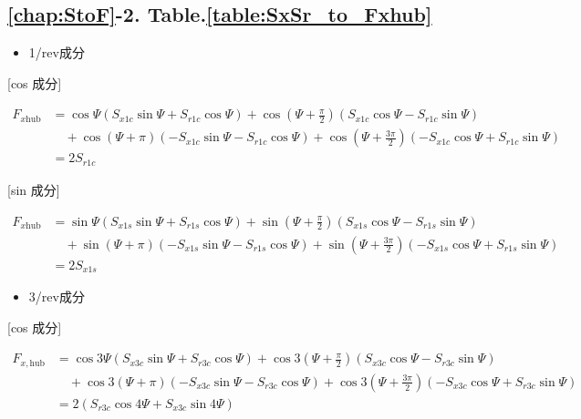     \subsection*{\ref{chap:StoF}-2. Table.\ref{table:SxSr_to_Fxhub}}

    \begin{itemize}
    \item 1/rev成分
    \end{itemize}

    [cos 成分]

    \begin{align}
    F_{x\mathrm{hub}}
    &= \cos\Psi
    \left(
    S_{x1c}\sin\Psi + S_{r1c}\cos\Psi
    \right)
    + \cos\left(\Psi + \frac{\pi}{2}\right)
    \left(
    S_{x1c}\cos\Psi - S_{r1c}\sin\Psi
    \right) \nonumber \\
    &\quad
    + \cos(\Psi + \pi)
    \left(
    - S_{x1c}\sin\Psi - S_{r1c}\cos\Psi
    \right)
    + \cos\left(\Psi + \frac{3\pi}{2}\right)
    \left(
    - S_{x1c}\cos\Psi + S_{r1c}\sin\Psi
    \right) \nonumber \\
    &= 2 S_{r1c}
    \end{align}

    [sin 成分]

    \begin{align}
    F_{x\mathrm{hub}}
    &= \sin\Psi
    \left(
    S_{x1s}\sin\Psi + S_{r1s}\cos\Psi
    \right)
    + \sin\left(\Psi + \frac{\pi}{2}\right)
    \left(
    S_{x1s}\cos\Psi - S_{r1s}\sin\Psi
    \right) \nonumber \\
    &\quad
    + \sin(\Psi + \pi)
    \left(
    - S_{x1s}\sin\Psi - S_{r1s}\cos\Psi
    \right)
    + \sin\left(\Psi + \frac{3\pi}{2}\right)
    \left(
    - S_{x1s}\cos\Psi + S_{r1s}\sin\Psi
    \right) \nonumber \\
    &= 2 S_{x1s}
    \end{align}

    \begin{itemize}
    \item 3/rev成分
    \end{itemize}

    [cos 成分]

    \begin{align}
    F_{x,\mathrm{hub}}
    &= \cos 3\Psi
    \left(
    S_{x3c}\sin\Psi + S_{r3c}\cos\Psi
    \right)
    + \cos 3\left(\Psi + \frac{\pi}{2}\right)
    \left(
    S_{x3c}\cos\Psi - S_{r3c}\sin\Psi
    \right) \nonumber \\
    &\quad
    + \cos 3(\Psi + \pi)
    \left(
    - S_{x3c}\sin\Psi - S_{r3c}\cos\Psi
    \right)
    + \cos 3\left(\Psi + \frac{3\pi}{2}\right)
    \left(
    - S_{x3c}\cos\Psi + S_{r3c}\sin\Psi
    \right) \nonumber \\
    &= 2\left(
    S_{r3c}\cos 4\Psi + S_{x3c}\sin 4\Psi
    \right)
    \end{align}

